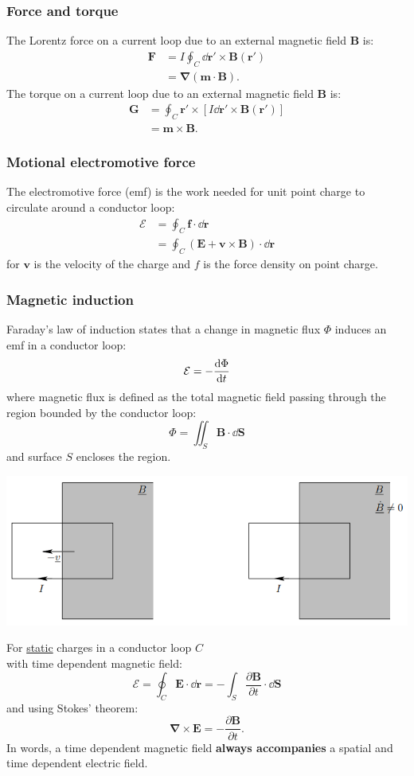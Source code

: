 \documentclass{article}
\newcommand{\vc}[1]{\boldsymbol{#1}}
\begin{document}
\begin{multicols*}{3}
\newcolumn

\subsubsection*{Force and torque}
The Lorentz force on a current loop due to an
external magnetic field $\vc{B}$ is:
\begin{align*}
    \vc{F}
    &=I\oint_C\dd\vc{r}'\times\vc{B}(\vc{r}') \\
    &=\vc{\nabla}(\vc{m}\cdot\vc{B}).
\end{align*}
The torque on a current loop due to an
external magnetic field $\vc{B}$ is:
\begin{align*}
    \vc{G}
    &=\oint_C\vc{r}'\times[I\dd\vc{r}'\times\vc{B}(\vc{r}')] \\
    &=\vc{m}\times\vc{B}.
\end{align*}

\subsubsection*{Motional electromotive force}
The electromotive force (emf) is the work needed for unit
point charge to circulate around a conductor loop:
\begin{align*}
    \mathcal{E}
    &=\oint_C\vc{f}\cdot\dd\vc{r} \\
    &=\oint_C(\vc{E}+\vc{v}\times\vc{B})\cdot\dd\vc{r}
\end{align*}
for $\vc{v}$ is the velocity of the charge
and $f$ is the force density on point charge.

\subsubsection*{Magnetic induction}
Faraday's law of induction states that
a change in magnetic flux $\Phi$ induces an emf
in a conductor loop:
$$\mathcal{E}=-\dv{\Phi}{t}$$
where magnetic flux is defined as the total
magnetic field passing through the region
bounded by the conductor loop:
$$\Phi=\iint_S\vc{B}\cdot\dd\vc{S}$$
and surface $S$ encloses the region.
\begin{center}
    \includegraphics[scale=0.55]{f10.png}
\end{center}
For \underline{static} charges in a conductor loop $C$ \\
with time dependent magnetic field:
$$\mathcal{E}=\oint_C\vc{E}\cdot\dd\vc{r}
=-\int_S\frac{\partial\vc{B}}{\partial t}
\cdot\dd\vc{S}$$
and using Stokes' theorem:
$$\vc{\nabla}\times\vc{E}=-\frac{\partial\vc{B}}{\partial t}.$$
In words, a time dependent magnetic field \textbf{always
accompanies} a spatial and time dependent electric field.


\end{multicols*}
\end{document}
